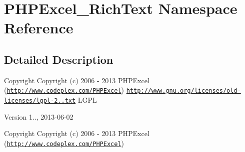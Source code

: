 \hypertarget{namespacePHPExcel__RichText}{}\section{P\+H\+P\+Excel\+\_\+\+Rich\+Text Namespace Reference}
\label{namespacePHPExcel__RichText}


\subsection{Detailed Description}
\begin{DoxyCopyright}{Copyright}
Copyright (c) 2006 -\/ 2013 P\+H\+P\+Excel (\href{http://www.codeplex.com/PHPExcel}{\tt http\+://www.\+codeplex.\+com/\+P\+H\+P\+Excel})  \href{http://www.gnu.org/licenses/old-licenses/lgpl-2.1.txt}{\tt http\+://www.\+gnu.\+org/licenses/old-\/licenses/lgpl-\/2..\+txt} L\+G\+PL 
\end{DoxyCopyright}
\begin{DoxyVersion}{Version}
1.., 2013-\/06-\/02
\end{DoxyVersion}
\begin{DoxyCopyright}{Copyright}
Copyright (c) 2006 -\/ 2013 P\+H\+P\+Excel (\href{http://www.codeplex.com/PHPExcel}{\tt http\+://www.\+codeplex.\+com/\+P\+H\+P\+Excel}) 
\end{DoxyCopyright}
